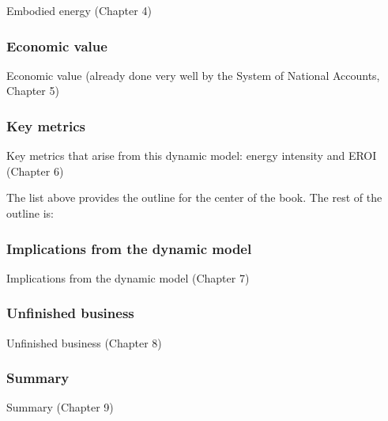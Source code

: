 Embodied energy (Chapter 4)

\subsubsection{Economic value}
\label{sec:economic_value}

Economic value (already done very well by the System of National Accounts, Chapter 5)

\subsubsection{Key metrics}
\label{sec:key_metrics}

Key metrics that arise from this dynamic model: energy intensity and EROI (Chapter 6)

The list above provides the outline for the center of the book. The rest of the outline is:

\subsubsection{Implications from the dynamic model}
\label{sec:implications}

Implications from the dynamic model (Chapter 7)

\subsubsection{Unfinished business}
\label{sec:unfinished_business}

Unfinished business (Chapter 8)

\subsubsection{Summary}
\label{sec:summary}

Summary (Chapter 9)






